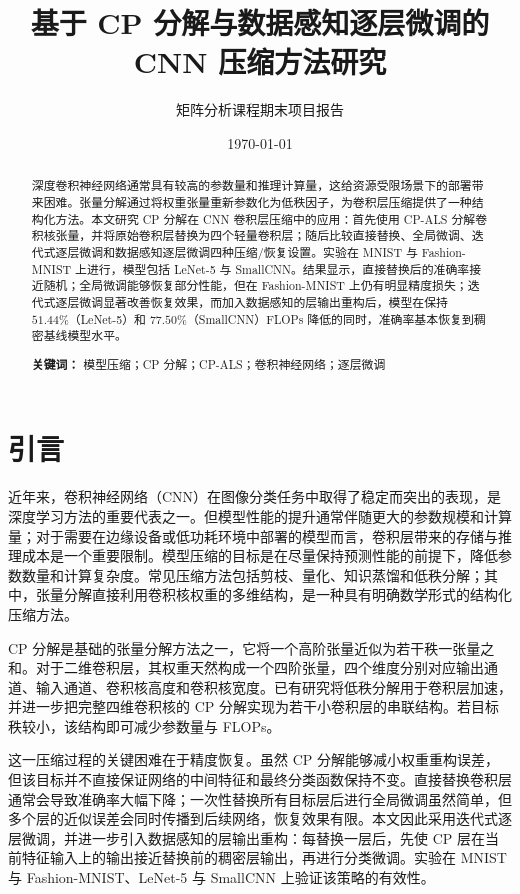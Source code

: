 \documentclass[11pt,a4paper,fontset=fandol]{ctexart}
\title{\bfseries 基于 CP 分解与数据感知逐层微调的 CNN 压缩方法研究}
\author{矩阵分析课程期末项目报告}
\date{\today}
\begin{document}
\maketitle

\begin{abstract}
深度卷积神经网络通常具有较高的参数量和推理计算量，这给资源受限场景下的部署带来困难。张量分解通过将权重张量重新参数化为低秩因子，为卷积层压缩提供了一种结构化方法。本文研究 CP 分解在 CNN 卷积层压缩中的应用：首先使用 CP-ALS 分解卷积核张量，并将原始卷积层替换为四个轻量卷积层；随后比较直接替换、全局微调、迭代式逐层微调和数据感知逐层微调四种压缩/恢复设置。实验在 MNIST 与 Fashion-MNIST 上进行，模型包括 LeNet-5 与 SmallCNN。结果显示，直接替换后的准确率接近随机；全局微调能够恢复部分性能，但在 Fashion-MNIST 上仍有明显精度损失；迭代式逐层微调显著改善恢复效果，而加入数据感知的层输出重构后，模型在保持 $51.44\%$（LeNet-5）和 $77.50\%$（SmallCNN）FLOPs 降低的同时，准确率基本恢复到稠密基线模型水平。

\textbf{关键词：} 模型压缩；CP 分解；CP-ALS；卷积神经网络；逐层微调
\end{abstract}

\section{引言}
近年来，卷积神经网络（CNN）在图像分类任务中取得了稳定而突出的表现，是深度学习方法的重要代表之一\cite{lecun2015deep}。但模型性能的提升通常伴随更大的参数规模和计算量；对于需要在边缘设备或低功耗环境中部署的模型而言，卷积层带来的存储与推理成本是一个重要限制。模型压缩的目标是在尽量保持预测性能的前提下，降低参数数量和计算复杂度。常见压缩方法包括剪枝、量化、知识蒸馏和低秩分解；其中，张量分解直接利用卷积核权重的多维结构，是一种具有明确数学形式的结构化压缩方法\cite{kolda2009tensor,comon2014tensors,panagakis2021tensor}。

CP 分解是基础的张量分解方法之一，它将一个高阶张量近似为若干秩一张量之和\cite{kolda2009tensor}。对于二维卷积层，其权重天然构成一个四阶张量，四个维度分别对应输出通道、输入通道、卷积核高度和卷积核宽度。已有研究将低秩分解用于卷积层加速，并进一步把完整四维卷积核的 CP 分解实现为若干小卷积层的串联结构\cite{denton2014exploiting,lebedev2015speeding}。若目标秩较小，该结构即可减少参数量与 FLOPs。

这一压缩过程的关键困难在于精度恢复。虽然 CP 分解能够减小权重重构误差，但该目标并不直接保证网络的中间特征和最终分类函数保持不变。直接替换卷积层通常会导致准确率大幅下降；一次性替换所有目标层后进行全局微调虽然简单，但多个层的近似误差会同时传播到后续网络，恢复效果有限。本文因此采用迭代式逐层微调，并进一步引入数据感知的层输出重构：每替换一层后，先使 CP 层在当前特征输入上的输出接近替换前的稠密层输出，再进行分类微调。实验在 MNIST 与 Fashion-MNIST、LeNet-5 与 SmallCNN 上验证该策略的有效性。
\end{document}
